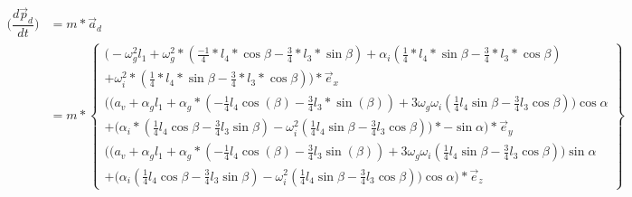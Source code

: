 \documentclass[a4paper,10pt]{article}
\begin{document}
\begin{equation}
\begin{aligned}
	\big(\dfrac{d\vec{p}_d}{dt}\big) &= m *\vec{a}_d\\
	&= m * \begin{Bmatrix}
	\Big( -\omega^{2}_g l_1 +\omega_{g}^{2} * (\frac{-1}{4}*l_4*\cos{\beta}-\frac{3}{4}*l_3*\sin{\beta})+\alpha_i(\frac{1}{4}*l_4 *\sin{\beta}-\frac{3}{4}*l_3 * \cos{\beta})\\ + \omega_i^2*(\frac{1}{4}*l_4 *\sin{\beta}-\frac{3}{4}*l_3 * \cos{\beta}) \Big)* \vec{e}_{x}\\
	\Bigg(\Big(a_v +\alpha_g l_1 +\alpha_g *({-\frac{1}{4}}  l_4 \cos(\beta)-\frac{3}{4}l_3*\sin(\beta)) + 3\omega_g\omega_i(\frac{1}{4}l_4 \sin{\beta}-\frac{3}{4}l_3  \cos{\beta})\Big)\cos{\alpha}\\ + \Big(\alpha_i * (\frac{1}{4} l_4 \cos{\beta} - \frac{3}{4} l_3 \sin{\beta}) - \omega_i^2(\frac{1}{4} l_4 \sin{\beta}-\frac{3}{4} l_3  \cos{\beta})\Big)*-\sin{\alpha}\Bigg)*\vec{e}_{y}\\
	\Bigg(\Big(a_v +\alpha_g l_1 +\alpha_g *({-\frac{1}{4}}  l_4 \cos(\beta)-\frac{3}{4}l_3 \sin(\beta)) + 3\omega_g\omega_i(\frac{1}{4}l_4 \sin{\beta}-\frac{3}{4}l_3  \cos{\beta})\Big)\sin{\alpha}\\ + \Big(\alpha_i (\frac{1}{4} l_4 \cos{\beta} - \frac{3}{4} l_3 \sin{\beta}) - \omega_i^2(\frac{1}{4} l_4 \sin{\beta}-\frac{3}{4} l_3   \cos{\beta})\Big) \cos{\alpha}\Bigg)*\vec{e}_{z}
	\end{Bmatrix}
\end{aligned}
\end{equation}
\end{document}
